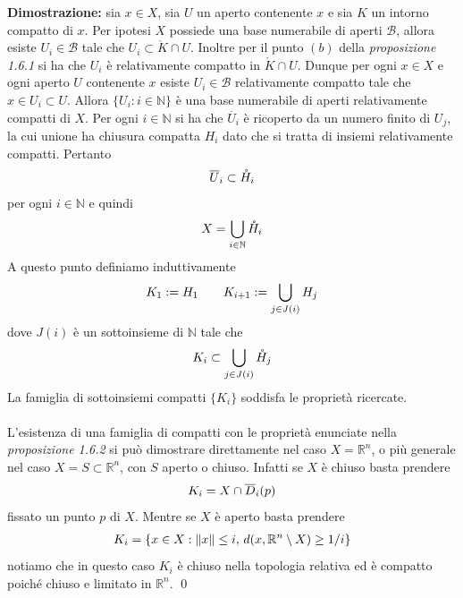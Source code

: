 \documentclass{article}
\begin{document}
\textbf{Dimostrazione:} sia $x \in X$, sia $U$ un aperto contenente $x$ e sia $K$ un intorno compatto di $x$. Per ipotesi $X$ possiede una base numerabile di aperti $\mathcal{B}$, allora esiste $U_i \in \mathcal{B}$ tale che $U_i \subset \mathring{K} \cap U$. Inoltre per il punto $(b)$ della \textit{proposizione 1.6.1} si ha che $U_i$ è relativamente compatto in $\mathring{K} \cap U$. Dunque per ogni $x \in X$ e ogni aperto $U$ contenente $x$ esiste $U_i \in \mathcal{B}$ relativamente compatto tale che $x \in U_i \subset U$. Allora $\{U_i : i \in \mathbb{N}\}$ è una base numerabile di aperti relativamente compatti di $X$. Per ogni $i \in \mathbb{N}$ si ha che $\overline{U}_i$ è ricoperto da un numero finito di $U_j$, la cui unione ha chiusura compatta $H_i$ dato che si tratta di insiemi relativamente compatti. Pertanto
\begin{align}
    \overline{U}_i \subset \mathring{H}_i \notag
\end{align}
per ogni $i \in \mathbb{N}$ e quindi
\begin{align}
    X = \bigcup_{i \in \mathbb{N}}\mathring{H}_i \notag
\end{align}
A questo punto definiamo induttivamente
\begin{align}
    K_1 := H_1 \qquad K_{i + 1} := \bigcup_{j \in J(i)}H_j \notag
\end{align}
dove $J(i)$ è un sottoinsieme di $\mathbb{N}$ tale che
\begin{align}
    K_i \subset \bigcup_{j \in J(i)}\mathring{H}_j \notag
\end{align}
La famiglia di sottoinsiemi compatti $\{K_i\}$ soddisfa le proprietà ricercate. \\ \\
L'esistenza di una famiglia di compatti con le proprietà enunciate nella \textit{proposizione 1.6.2} si può dimostrare direttamente nel caso $X = \mathbb{R}^n$, o più generale nel caso $X = S \subset \mathbb{R}^n$, con $S$ aperto o chiuso. Infatti se $X$ è chiuso basta prendere
\begin{align}
    K_i = X \cap \overline{D}_i(p) \notag
\end{align}
fissato un punto $p$ di $X$. Mentre se $X$ è aperto basta prendere
\begin{align}
    K_i = \{x \in X : \|x\| \leq i, \, d(x, \mathbb{R}^n \setminus X) \geq 1/i\} \notag
\end{align}
notiamo che in questo caso $K_i$ è chiuso nella topologia relativa ed è compatto poiché chiuso e limitato in $\mathbb{R}^n$. \qed \\ \\
\end{document}
